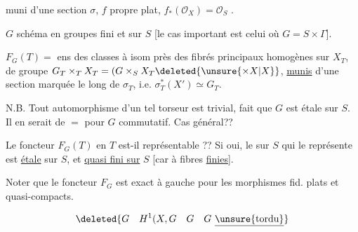 muni d'une section $\sigma$, $f$ propre plat, $f_*(\mathcal O_X)=\mathcal O_S$ \uline{}.

$G$ schéma en groupes  fini et   sur $S$
[le cas important est celui où $G=S\times\Gamma$].

$F_G(T)=$ ens des classes à isom près des
fibrés principaux homogènes sur $X_T$, de groupe
$G_T\times_T X_T=(G\times_{S} X_T\deleted{\unsure{\times X|X}}$, \uline{munis} d'une section
marquée le long de $\sigma_T$, i.e.  $\sigma_T^*(X')\simeq G_T$.

N.B. Tout automorphisme d'un tel torseur
est trivial,  fait que $G$
est  étale sur $S$. Il en serait de
$=$ pour $G$ commutatif. Cas général??

Le foncteur $F_G(T)$ en $T$ est-il
représentable ?? Si oui, le  sur $S$
qui le représente est \uline{étale} sur $S$, et
\uline{quasi fini sur} $S$ [car à fibres
\uline{finies}].


Noter que le foncteur $F_G$
est  exact à gauche
pour les morphismes fid. plats
et quasi-compacts.

\[
\deleted{G\quad H^1(X,G\quad G\quad G\ \underline{\unsure{\text{tordu}}}}
\]
